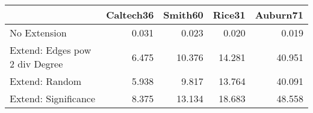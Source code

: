 \begin{tabular}{lrrrr}
\toprule
{} & Caltech36 & Smith60 & Rice31 & Auburn71 \\
\midrule
No Extension                   &     0.031 &   0.023 &  0.020 &    0.019 \\
Extend: Edges pow 2 div Degree &     6.475 &  10.376 & 14.281 &   40.951 \\
Extend: Random                 &     5.938 &   9.817 & 13.764 &   40.091 \\
Extend: Significance           &     8.375 &  13.134 & 18.683 &   48.558 \\
\bottomrule
\end{tabular}
